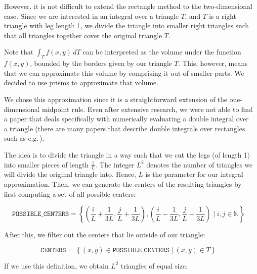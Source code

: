 \documentclass[a4paper, twoside]{article}
\begin{document}
However, it is not difficult to extend the rectangle method to the two-dimensional case. Since we are interested in an integral over a triangle $T$, and $T$ is a right triangle with leg length 1, we divide the triangle into smaller right triangles such that all triangles together cover the original triangle $T$.

Note that $\int_T f(x,y)\,dT$ can be interpreted as the volume under the function $f(x,y)$, bounded by the borders given by our triangle $T$. This, however, means that we can approximate this volume by comprising it out of smaller parts. We decided to use prisms to approximate that volume.

We chose this approximation since it is a straightforward extension of the one-dimensional midpoint rule. Even after extensive research, we were not able to find a paper that deals specifically with numerically evaluating a double integral over a triangle (there are many papers that describe double integrals over rectangles such as e.g.\,\cite{lang1987double}).

The idea is to divide the triangle in a way such that we cut the legs (of length 1) into smaller pieces of length $\frac{1}{L}$.
The integer $L^2$ denotes the number of triangles we will divide the original triangle into.
Hence, $L$ is the parameter for our integral approximation.
Then, we can generate the centers of the resulting triangles by first computing a set of all possible centers:

\begin{equation*}
  \mathtt{POSSIBLE\_CENTERS} = \left\{
    \left(\frac{i}{L} + \frac{1}{3L}, \frac{j}{L} + \frac{1}{3L}\right) ,
    \left(\frac{i}{L} - \frac{1}{3L}, \frac{j}{L} - \frac{1}{3L}\right)
    \mid
    i, j\in \mathbb{N}
  \right\}
\end{equation*}

After this, we filter out the centers that lie outside of our triangle:

\begin{equation*}
  \mathtt{CENTERS} = \left\{
    (x,y)\in \mathtt{POSSIBLE\_CENTERS}
    \mid
    (x,y) \in T
  \right\}
\end{equation*}

If we use this definition, we obtain $L^2$ triangles of equal size.
\end{document}
